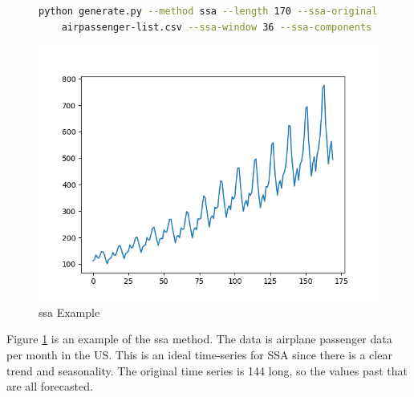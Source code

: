 \begin{figure}
\begin{lstlisting}[language=bash]
    python generate.py --method ssa --length 170 --ssa-original \
    airpassenger-list.csv --ssa-window 36 --ssa-components 13 --display
\end{lstlisting}
\includegraphics[scale=0.7]{figures/ssa}
\caption{ssa Example}    
\label{fig:ssa-example}
\end{figure}

Figure \ref{fig:ssa-example} is an example of the ssa method. The data is airplane passenger data per month in the US. This is an ideal time-series for SSA since there is a clear trend and seasonality. The original time series is 144 long, so the values past that are all forecasted.